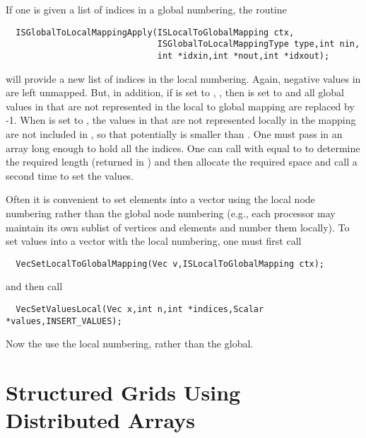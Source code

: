 If one is given a list of indices in a global numbering, the routine
\begin{verbatim}
  ISGlobalToLocalMappingApply(ISLocalToGlobalMapping ctx,
                              ISGlobalToLocalMappingType type,int nin,
                              int *idxin,int *nout,int *idxout);
\end{verbatim}
   will provide
a new list of indices in the local numbering. Again, negative values in 
 are left unmapped.  But, in addition, if  is set to ,
, then  is set to  and all global values
in  that are not represented in the local to global mapping
are replaced by -1. When  is set to ,
 the values in  that are not
represented locally in the mapping are not included in , so that
potentially  is smaller than .  One must
pass in an array long enough to hold all the indices. One can call
 with  equal to  to determine the required length (returned in )
and then allocate the required space and call  a second time to set the values.

Often it is convenient to set elements into a vector using the local node 
numbering rather than the global node numbering (e.g.,  each processor may
maintain its own sublist of vertices and elements and number them locally).
To set values into a vector with the local numbering, one must first call
\begin{verbatim}
  VecSetLocalToGlobalMapping(Vec v,ISLocalToGlobalMapping ctx);
\end{verbatim}
 
and then call 
\begin{verbatim}
  VecSetValuesLocal(Vec x,int n,int *indices,Scalar *values,INSERT_VALUES);
\end{verbatim}
Now the  use the local numbering, rather than the global.

\section{Structured Grids Using Distributed Arrays}
\label{sec:da} \label{sec:struct}

